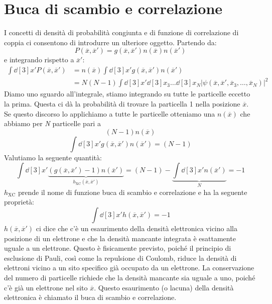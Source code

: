 \section{Buca di scambio e correlazione}
I concetti di densità di probabilità congiunta e di funzione di correlazione di coppia ci consentono di introdurre un ulteriore oggetto. Partendo da:
\begin{equation*}
    P(\overline x, \overline{x}')=g(\overline x, \overline{x}')n(\overline x)n(\overline{x}')
\end{equation*}
e integrando rispetto a $\overline{x}'$:
\begin{equation*}
    \begin{aligned}
        \int \dd[3]{x'}P(\overline x, \overline{x}') &= n(\overline x)\int \dd[3]{x'} g(\overline x, \overline{x}')n(\overline{x}') \\
        & = N(N-1)\int\dd[3]{x'}\dd[3]{x}_3\dots\dd[3]{x}_N|\psi(\overline x, \overline{x}', \overline{x}_3, \dots, \overline{x}_N)|^2
    \end{aligned}
\end{equation*}
Diamo uno sguardo all'integrale, stiamo integrando su tutte le particelle eccetto la prima. Questa ci dà la probabilità di trovare la particella 1 nella posizione $\overline x$. Se questo discorso lo applichiamo a tutte le particelle otteniamo una $n(\overline x)$ che abbiamo per \textit{N} particelle pari a
\begin{equation*}
    (N-1)n(\overline x)
\end{equation*}
\begin{equation*}
    \int \dd[3]{x'}g(\overline x, \overline{x}')n(\overline{x}')=(N-1)
\end{equation*}
Valutiamo la seguente quantità:
\begin{equation*}
    \int \dd[3]{x'}\underbrace{(g(\overline x, \overline{x}')-1)n(\overline{x}')}_{h_{\text{XC}}(\overline x, \overline{x}')}=(N-1)-\underbrace{\int \dd[3]{x'}n(\overline{x}')}_{N}=-1
\end{equation*}
$h_{\text{XC}}$ prende il nome di funzione buca di scambio e correlazione e ha la seguente proprietà:
\begin{equation*}
    \int \dd[3]{x'}h(\overline x, \overline{x}')=-1
\end{equation*}
$h(\overline x, \overline{x}')$ ci dice che c'è un esaurimento della densità elettronica vicino alla posizione di un elettrone e che la densità mancante integrata è esattamente uguale a un elettrone. Questo è fisicamente previsto, poiché il principio di esclusione di Pauli, così come la repulsione di Coulomb, riduce la densità di elettroni vicino a un sito specifico già occupato da un elettrone. La conservazione del numero di particelle richiede che la densità mancante sia uguale a uno, poiché c'è già un elettrone nel sito $\overline x$. Questo esaurimento (o lacuna) della densità elettronica è chiamato il buca di scambio e correlazione. \\
